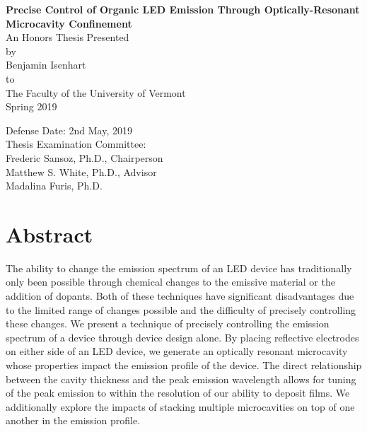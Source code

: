 \documentclass{report}
\author{Benjamin Isenhart}
\begin{document}
\begin{titlepage}
	\begin{center}
		\vspace{1cm}
		\Huge
		\textbf{Precise Control of Organic LED Emission Through Optically-Resonant Microcavity Confinement}\\
		\vspace{1.5cm}
		\Large
		An Honors Thesis Presented\\
		by\\
		Benjamin Isenhart\\
		to\\
		The Faculty of the University of Vermont\\
		\vspace{0.5cm}
		Spring 2019
		\vspace{2cm}
	\end{center}
	\begin{flushright}
		\Large
		Defense Date: 2nd May, 2019\\
		Thesis Examination Committee:\\
		\vspace{0.5cm}
		Frederic Sansoz, Ph.D., Chairperson\\
		Matthew S. White, Ph.D., Advisor\\
		Madalina Furis, Ph.D.\\
	\end{flushright}
\end{titlepage}

\chapter*{Abstract} \label{abstract}
The ability to change the emission spectrum of an LED device has traditionally only been possible through chemical changes to the emissive material or the addition of dopants. Both of these techniques have significant disadvantages due to the limited range of changes possible and the difficulty of precisely controlling these changes. We present a technique of precisely controlling the emission spectrum of a device through device design alone. By placing reflective electrodes on either side of an LED device, we generate an optically resonant microcavity whose properties impact the emission profile of the device. The direct relationship between the cavity thickness and the peak emission wavelength allows for tuning of the peak emission to within the resolution of our ability to deposit films. We additionally explore the impacts of stacking multiple microcavities on top of one another in the emission profile.
\end{document}

